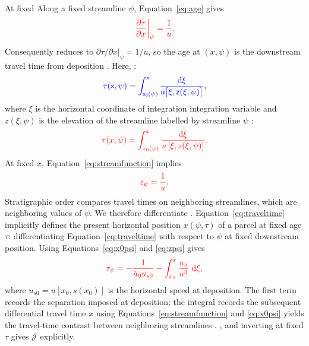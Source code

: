 \documentclass[review]{igs}
\providecommand{\DIFadd}[1]{{\protect\color{blue} \sf #1}} %
\providecommand{\DIFdel}[1]{{\protect\color{red} \scriptsize #1}} %
\providecommand{\DIFaddbegin}{} %
\providecommand{\DIFaddend}{} %
\providecommand{\DIFdelbegin}{} %
\providecommand{\DIFdelend}{} %
\newcommand{\DIFscaledelfig}{0.5}
\newlength{\DIFdelgraphicswidth} %
\newlength{\DIFdelgraphicsheight} %
\newcommand{\DIFaddincludegraphics}[2][]{{\color{blue}\fbox{\DIFOincludegraphics[#1]{#2}}}} %
\newcommand{\DIFdelincludegraphics}[2][]{%
\sbox{\DIFdelgraphicsbox}{\DIFOincludegraphics[#1]{#2}}%
\settoboxwidth{\DIFdelgraphicswidth}{\DIFdelgraphicsbox} %
\settoboxtotalheight{\DIFdelgraphicsheight}{\DIFdelgraphicsbox} %
\scalebox{\DIFscaledelfig}{%
\parbox[b]{\DIFdelgraphicswidth}{\usebox{\DIFdelgraphicsbox}\\[-\baselineskip] \rule{\DIFdelgraphicswidth}{0em}}\llap{\resizebox{\DIFdelgraphicswidth}{\DIFdelgraphicsheight}{%
\setlength{\unitlength}{\DIFdelgraphicswidth}%
\begin{picture}(1,1)%
\thicklines\linethickness{2pt} %
{\color[rgb]{1,0,0}\put(0,0){\framebox(1,1){}}}%
{\color[rgb]{1,0,0}\put(0,0){\line( 1,1){1}}}%
{\color[rgb]{1,0,0}\put(0,1){\line(1,-1){1}}}%
\end{picture}%
}\hspace*{3pt}}} %
} %
\DeclareRobustCommand{\DIFaddbegin}{\DIFOaddbegin \let\includegraphics\DIFaddincludegraphics} %
\DeclareRobustCommand{\DIFaddend}{\DIFOaddend \let\includegraphics\DIFOincludegraphics} %
\DeclareRobustCommand{\DIFdelbegin}{\DIFOdelbegin \let\includegraphics\DIFdelincludegraphics} %
\DeclareRobustCommand{\DIFdelend}{\DIFOaddend \let\includegraphics\DIFOincludegraphics} %
\begin{document}
\DIFdelbegin \DIFdel{At fixed }\DIFdelend \DIFaddbegin \DIFadd{Along a fixed streamline }\DIFaddend \(\psi\), Equation~\ref{eq:age} \DIFdelbegin \DIFdel{gives
}\begin{displaymath}
\DIFdel{\left.\frac{\partial\tau}{\partial x}\right|_{\psi}=\frac{1}{u}.
}\end{displaymath}%
\DIFdel{Consequently }\DIFdelend \DIFaddbegin \DIFadd{reduces to \(\left.\partial\tau/\partial x\right|_{\psi}=1/u\), so }\DIFaddend the age at \((x,\psi)\) is the \DIFaddbegin \DIFadd{downstream }\DIFaddend travel time from deposition\DIFdelbegin \DIFdel{. Here, }\DIFdelend \DIFaddbegin \DIFadd{:
}\begin{equation}
\DIFadd{\tau(x,\psi)=\int_{x_0(\psi)}^{x}
\frac{\mathop{}\!\mathrm{d}\xi}{u\bigl[\xi,z(\xi,\psi)\bigr]},
\label{eq:traveltime}
}\end{equation}
\DIFadd{where }\DIFaddend \(\xi\) is the horizontal \DIFdelbegin \DIFdel{coordinate of integration }\DIFdelend \DIFaddbegin \DIFadd{integration variable }\DIFaddend and \(z(\xi,\psi)\) is the elevation of \DIFdelbegin \DIFdel{the streamline labelled by }\DIFdelend \DIFaddbegin \DIFadd{streamline }\DIFaddend \(\psi\)\DIFdelbegin \DIFdel{:
}\begin{displaymath}
\DIFdel{\tau(x,\psi)=\int_{x_0(\psi)}^{x}
\frac{\mathop{}\!\mathrm{d}\xi}{u\left[\xi,z(\xi,\psi)\right]}.
}\end{displaymath}%
\DIFdel{At fixed \(x\), Equation~\ref{eq:streamfunction} implies
}\begin{displaymath}
 \DIFdel{z_{\psi}=\frac{1}{u}.
}\end{displaymath}%
\DIFdel{Stratigraphic order compares travel times on neighboring streamlines, which are neighboring values of \(\psi\). We therefore differentiate }\DIFdelend \DIFaddbegin \DIFadd{. Equation~\ref{eq:traveltime} implicitly defines the present horizontal position \(x(\psi,\tau)\) of a parcel at fixed age \(\tau\): differentiating }\DIFaddend Equation~\ref{eq:traveltime} with respect to \(\psi\) at fixed \DIFdelbegin \DIFdel{downstream position. Using Equations~\ref{eq:x0psi} and \ref{eq:zpsi} gives
}\begin{displaymath}
\DIFdel{\tau_{\psi}
=-\frac{1}{\dot a_0u_{s0}}
-\int_{x_0}^{x}\frac{u_z}{u^3}\,\mathop{}\!\mathrm{d}\xi,
}\end{displaymath}%
\DIFdel{where \(u_{s0}=u\left[x_0,s(x_0)\right]\) is the horizontal speed at deposition. The first term records the separation imposed at deposition; the integral records the subsequent differential travel time }\DIFdelend \DIFaddbegin \DIFadd{\(x\) using Equations~\ref{eq:streamfunction} and \ref{eq:x0psi} yields the travel-time contrast }\DIFaddend between neighboring streamlines\DIFdelbegin \DIFdel{.
}\DIFdelend \DIFaddbegin \DIFadd{, and inverting at fixed \(\tau\) gives \(\mathcal{J}\) explicitly.
}\DIFaddend 
\end{document}
